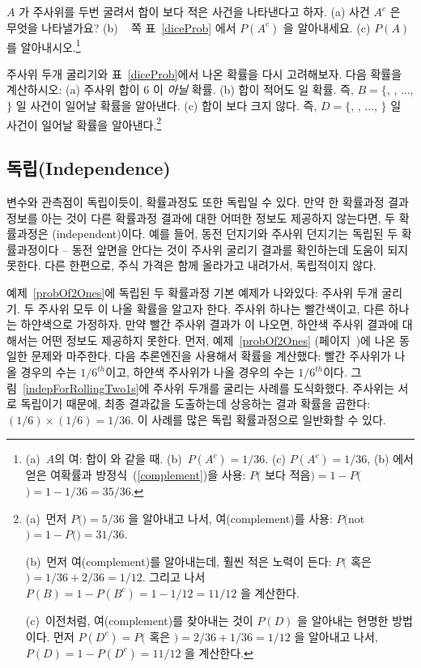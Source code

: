 \begin{exercise}

$A$ 가 주사위를 두번 굴려서 합이  보다 적은 사건을 나타낸다고 하자. (a) 사건 $A^c$ 은 무엇을 나타낼가요? (b) ~\pageref{diceProb} 쪽 표~\ref{diceProb} 에서 $P(A^c)$ 을 알아내세요. (c) $P(A)$ 를 알아내시오.\footnote{(a)~$A$의 여: 합이  와 같을 때. (b)~$P(A^c) = 1/36$. (c) $P(A^c) = 1/36$, (b) 에서 얻은 여확률과  방정식~(\ref{complement})을 사용: $P($  보다 적음$) = 1 - P($$) = 1 - 1/36 = 35/36$.}
\end{exercise}

\begin{exercise} 주사위 두개 굴리기와 표~\ref{diceProb}에서 나온 확률을 다시 고려해보자. 다음 확률을 계산하시오: (a) 주사위 합이 6 이 \emph{아닐} 확률. (b) 합이 적어도  일 확률. 즉, 
$B=\{$, , ..., $\}$ 일 사건이 일어날 확률을 알아낸다. (c) 합이  보다 크지 않다. 즉, $D=\{$, , ..., $\}$ 일 사건이 일어날 확률을 알아낸다.\footnote{(a)~먼저 $P($$)=5/36$ 을 알아내고 나서, 여(complement)를 사용: $P($not $) = 1 - P($$) = 31/36$.

(b)~먼저 여(complement)를 알아내는데, 훨씬 적은 노력이 든다: $P($ 혹은 $)=1/36+2/36=1/12$. 그리고 나서 $P(B) = 1-P(B^c) = 1-1/12 = 11/12$ 을 계산한다.

(c)~이전처럼, 여(complement)를 찾아내는 것이 $P(D)$ 을 알아내는 현명한 방법이다. 먼저 $P(D^c) = P($ 혹은 $)=2/36 + 1/36=1/12$ 을 알아내고 나서, $P(D) = 1 - P(D^c) = 11/12$ 을 계산한다.}
\end{exercise}


\subsection{독립(Independence)}
\label{probabilityIndependence}

변수와 관측점이 독립이듯이, 확률과정도 또한 독립일 수 있다. 만약 한 확률과정 결과 정보를 아는 것이 다른 확률과정 결과에 대한 어떠한 정보도 제공하지 않는다면, 두 확률과정은 (independent)이다. 예를 들어, 동전 던지기와 주사위 던지기는 독립된 두 확률과정이다 -- 동전 앞면을 안다는 것이 주사위 굴리기 결과를 확인하는데 도움이 되지 못한다. 다른 한편으로, 주식 가격은 함께 올라가고 내려가서, 독립적이지 않다.

예제~\ref{probOf2Ones}에 독립된 두 확률과정 기본 예제가 나와있다: 주사위 두개 굴리기. 두 주사위 모두 이 나올 확률을 알고자 한다. 주사위 하나는 빨간색이고, 다른 하나는 하얀색으로 가정하자. 만약 빨간 주사위 결과가 이 나오면, 하얀색 주사위 결과에 대해서는 어떤 정보도 제공하지 못한다. 먼저,  예제~\ref{probOf2Ones} (페이지~\pageref{probOf2Ones})에 나온 동일한 문제와 마주한다. 다음 추론엔진을 사용해서 확률을 계산했다: 빨간 주사위가 나올 경우의 수는 $1/6^{th}$이고, 하얀색 주사위가 나올 경우의 수는 $1/6^{th}$이다. 그림~\ref{indepForRollingTwo1s}에 주사위 두개를 굴리는 사례를 도식화했다. 주사위는 서로 독립이기 때문에, 최종 결과값을 도출하는데 상응하는 결과 확률을 곱한다: $(1/6)\times(1/6)=1/36$. 이 사례를 많은 독립 확률과정으로 일반화할 수 있다.  

